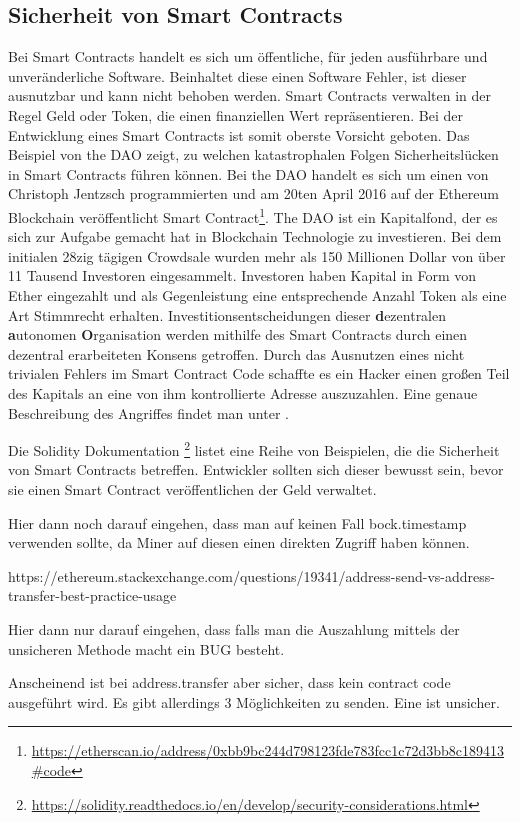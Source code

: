 \subsection{Sicherheit von Smart Contracts}
Bei Smart Contracts handelt es sich um öffentliche, für jeden ausführbare und unveränderliche Software. Beinhaltet diese einen Software Fehler, ist dieser ausnutzbar und kann nicht behoben werden. Smart Contracts verwalten in der Regel Geld oder Token, die einen finanziellen Wert repräsentieren. Bei der Entwicklung eines Smart Contracts ist somit oberste Vorsicht geboten.  Das Beispiel von the DAO zeigt, zu welchen katastrophalen Folgen Sicherheitslücken in Smart Contracts führen können.
Bei the DAO handelt es sich um einen von Christoph Jentzsch programmierten und am 20ten April 2016 auf der Ethereum Blockchain veröffentlicht Smart Contract\footnote{\url{https://etherscan.io/address/0xbb9bc244d798123fde783fcc1c72d3bb8c189413\#code}}.
The DAO ist ein Kapitalfond, der es sich zur Aufgabe gemacht hat in Blockchain Technologie zu investieren. Bei dem initialen 28zig tägigen Crowdsale wurden mehr als 150 Millionen Dollar von über 11 Tausend Investoren eingesammelt. Investoren haben Kapital in Form von Ether eingezahlt und als Gegenleistung eine entsprechende Anzahl Token als eine Art Stimmrecht erhalten. Investitionsentscheidungen dieser \textbf{d}ezentralen \textbf{a}utonomen \textbf{O}rganisation werden mithilfe des Smart Contracts durch einen dezentral erarbeiteten Konsens getroffen. Durch das Ausnutzen eines nicht trivialen Fehlers im Smart Contract Code schaffte es ein Hacker einen großen Teil des Kapitals an eine von ihm kontrollierte Adresse auszuzahlen. Eine genaue Beschreibung des Angriffes findet man unter \cite{eth_dao_hack}.

Die Solidity Dokumentation \footnote{\url{https://solidity.readthedocs.io/en/develop/security-considerations.html}} listet eine Reihe von Beispielen, die die Sicherheit von Smart Contracts betreffen. Entwickler sollten sich dieser bewusst sein, bevor sie einen Smart Contract veröffentlichen der Geld verwaltet.

\if
Hier dann noch darauf eingehen, dass man auf keinen Fall bock.timestamp verwenden sollte, da Miner auf diesen einen direkten Zugriff haben können.

https://ethereum.stackexchange.com/questions/19341/address-send-vs-address-transfer-best-practice-usage

Hier dann nur darauf eingehen, dass falls man die Auszahlung mittels der unsicheren Methode macht ein BUG besteht. 

Anscheinend ist bei address.transfer aber sicher, dass kein contract code ausgeführt wird. Es gibt allerdings 3 Möglichkeiten zu senden.
Eine ist unsicher.


\fi
